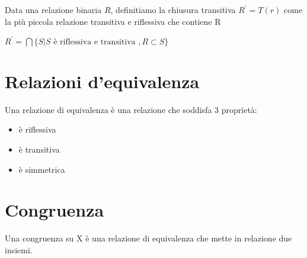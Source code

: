 \documentclass[a4paper]{article}
\begin{document}
Data una relazione binaria $R$, definitiamo la chiusura transitiva $R^{'} = T(r)$ come la più piccola relazione transitiva e riflessiva che contiene R

$R^{'} = \bigcap \{S|S \text{ è riflessiva e transitiva }, R \subset S \}$

\section{Relazioni d'equivalenza}

Una relazione di equivalenza è una relazione che soddisfa 3 proprietà:

\begin{itemize}
	\item è riflessiva
	\item è transitiva
	\item è simmetrica
\end{itemize}

\section{Congruenza}

Una congruenza su X è una relazione di equivalenza che mette in relazione due insiemi.
\end{document}
